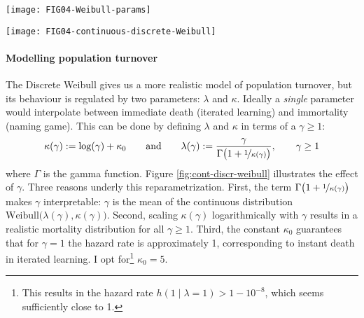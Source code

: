 \documentclass{../src/bcthesispart}
\begin{document}
\begin{SCfigure}
	\texttt{[image: FIG04-Weibull-params]}
	\caption{
	The Weibull distribution can model the probability that an agent dies at time $t$.
	 Varying the parameters of a Weibull distribution illustrates that $\lambda$ is a scale parameter and $\kappa$ a shape paramater.
	 If $\kappa>1$ the Weibull is a unimodal distribution, whose variance decreases with higher $\kappa$ (thinner lines), but for $\kappa<1$ the distribution has no mode.
	When $\kappa=1$ the Weibull reduces to a exponential distribution.
		\label{fig:weibull-params}}
\end{SCfigure}

\begin{SCfigure}
	\texttt{[image: FIG04-continuous-discrete-Weibull]}
	\caption{The single-parameter version of the continuous and discrete Weibull distribution. 
		 The distributions closely line up and $\gamma$ is easily interpretable. 
		 The hazard rate increases with time, thus capturing ageing effects. 
		Note that a continuous hazard rate $h(t)$ is not a distribution and exceeds 1.
		\label{fig:cont-discr-weibull}}
\end{SCfigure}




\paragraph{Modelling population turnover}

The Discrete Weibull gives us a more realistic model of population turnover, but its behaviour is regulated by two parameters: $\lambda$ and $\kappa$.
Ideally a \emph{single} parameter would interpolate between immediate death (iterated learning) and immortality (naming game).
This can be done by defining $\lambda$ and $\kappa$ in terms of a $\gamma \ge 1$:
\begin{align}
	\kappa(\gamma) := \log(\gamma) + \kappa_0
	\qquad\text{and}\qquad
	\lambda(\gamma) := \frac{\gamma}{\Gamma\bigl(1 + \nicefrac{1}{\kappa(\gamma)}\bigl)}, \qquad \gamma\ge1
\end{align}
where $\Gamma$ is the gamma function. 
Figure \ref{fig:cont-discr-weibull} illustrates the effect of $\gamma$.
Three reasons underly this reparametrization. 
First, the term $\Gamma\bigl( 1 + \nicefrac{1}{\kappa(\gamma)}\bigl)$ makes $\gamma$ interpretable: $\gamma$ is the mean of the continuous distribution $\text{Weibull}\bigl(\lambda(\gamma), \kappa(\gamma)\bigl)$.
Second, scaling $\kappa(\gamma)$ logarithmically with $\gamma$ results in a realistic mortality distribution for all $\gamma\ge 1$.
Third, the constant $\kappa_0$ guarantees that for $\gamma=1$ the hazard rate is approximately 1, corresponding to instant death in iterated learning. I opt for\footnote{This results in the hazard rate $h(1 \mid \lambda=1) > 1 - 10^{-8}$, which seems sufficiently close to 1.} $\kappa_0 = 5$.
\end{document}
